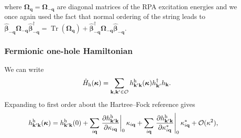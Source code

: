 where $\boldsymbol{\Omega}_{\mathbf q}=\boldsymbol{\Omega}_{-\mathbf q}$ are diagonal matrices of the RPA excitation energies and we once again used the fact that normal ordering of the string leads to $\hat{\bm{\beta}}_{-\mathbf q} \boldsymbol{\Omega}_{-\mathbf q} \hat{\bm{\beta}}_{-\mathbf q}^{\dagger} = \operatorname{Tr}(\boldsymbol{\Omega}_{\mathbf q}) + \hat{\bm{\beta}}_{-\mathbf q}^{\dagger} \boldsymbol{\Omega}_{-\mathbf q} \hat{\bm{\beta}}_{-\mathbf q}$. 
\subsubsection{Fermionic one-hole Hamiltonian}
We can write
\begin{equation}
    \hat H_{\rm h}(\boldsymbol{\kappa})
    =
    \sum_{\mathbf k,\mathbf k'\in\mathcal O}
    h^{\rm h}_{\mathbf k'\mathbf k}(\boldsymbol{\kappa})
    h_{\mathbf k'}^\dagger h_{\mathbf k}.
    \label{eq:hole_hamiltonian_kappa}
\end{equation} Expanding to first order about the
Hartree--Fock reference gives
\begin{align}
    h^{\rm h}_{\mathbf k'\mathbf k}(\boldsymbol{\kappa})
    &=
    h^{\rm h}_{\mathbf k'\mathbf k}(0)+
    \sum_{i\mathbf q}
    \left.
    \frac{\partial
    h^{\rm h}_{\mathbf k'\mathbf k}}
    {\partial\kappa_{i\mathbf q}}
    \right|_{0}
    \kappa_{i\mathbf q}+
    \sum_{i\mathbf q}
    \left.
    \frac{\partial
    h^{\rm h}_{\mathbf k'\mathbf k}}
    {\partial\kappa_{i\mathbf q}^{*}}
    \right|_{0}
    \kappa_{i\mathbf q}^{*}
    +
    \mathcal O(\kappa^2),
    \label{eq:hole_hamiltonian_expansion}
\end{align}

